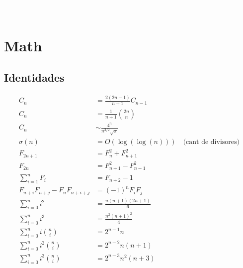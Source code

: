 


\def\title{Universidad Nacional de Rosario - Don Gato}
\textcolor{white}{.}\\[0.2cm]
 \\[0.5cm]
\tableofcontents\newpage

\section{Math}
\subsection{Identidades}
\begin{align*}
	C_n &= \frac{2(2n-1)}{n+1} C_{n-1} \\
	C_n &= \frac{1}{n+1} \binom{2n}{n} \\
	C_n &\sim \frac{4^n}{n^{3/2}\sqrt{\pi}} \\
	\sigma(n) &= O(\log(\log(n))) \:\:\:\text{ (cant de divisores)}\\
	F_{2n+1} &= F_{n}^2 + F_{n+1}^2 \\
	F_{2n} &= F_{n+1}^2 - F_{n-1}^2 \\
	\sum_{i=1}^n F_i &= F_{n+2}-1 \\
	F_{n+i}F_{n+j} - F_nF_{n+i+j} &= (-1)^n F_iF_j \\
	\sum_{i=0}^n i^2 &= \frac{n(n+1)(2n+1)}{6} \\
	\sum_{i=0}^n i^3 &= \frac{n^2(n+1)^2}{4} \\
	\sum_{i=0}^n i \binom n i &= 2^{n - 1}n \\
	\sum_{i=0}^n i^2 \binom n i &= 2^{n - 2}n(n+1) \\
	\sum_{i=0}^n i^3 \binom n i &= 2^{n - 3}n^2(n+3) \\
\end{align*}




